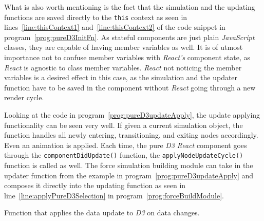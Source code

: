 What is also worth mentioning is the fact that the simulation and the updating functions are saved directly to the \texttt{this} context as seen in lines~\ref{line:thisContext1} and~\ref{line:thisContext2} of the code snippet in program~\ref{prog:pureD3InitFn}. As stateful components are just plain \emph{JavaScript} classes, they are capable of having member variables as well. It is of utmost importance not to confuse member variables with \emph{React's} component state, as \emph{React} is agnostic to class member variables. \emph{React} not noticing the member variables is a desired effect in this case, as the simulation and the updater function have to be saved in the component without \emph{React} going through a new render cycle. 

Looking at the code in program~\ref{prog:pureD3updateApply}, the update applying functionality can be seen very well. If given a current simulation object, the function handles all newly entering, transitioning, and exiting nodes accordingly. Even an animation is applied. Each time, the pure \emph{D3} \emph{React} component goes through the \texttt{componentDidUpdate()} function, the \texttt{applyNodeUpdateCycle()} function is called as well. The force simulation building module can take in the updater function from the example in program~\ref{prog:pureD3updateApply} and composes it directly into the updating function as seen in line~\ref{line:applyPureD3Selection} in program~\ref{prog:forceBuildModule}.

\begin{program}[th]
\caption{Function that applies the data update to \emph{D3} on data changes.}
\label{prog:pureD3updateApply}
\end{program}

